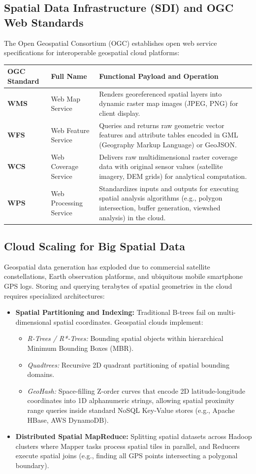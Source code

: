 \documentclass[11pt,a4paper,openany]{report}
\begin{document}
\subsection{Spatial Data Infrastructure (SDI) and OGC Web Standards}
The Open Geospatial Consortium (OGC) establishes open web service specifications for interoperable geospatial cloud platforms:
\begin{center}
\begin{tabularx}{\textwidth}{>{\bfseries}l p{3.5cm} X}
\toprule
OGC Standard & Full Name & Functional Payload and Operation\\
\midrule
WMS & Web Map Service & Renders georeferenced spatial layers into dynamic raster map images (JPEG, PNG) for client display.\\
WFS & Web Feature Service & Queries and returns raw geometric vector features and attribute tables encoded in GML (Geography Markup Language) or GeoJSON.\\
WCS & Web Coverage Service & Delivers raw multidimensional raster coverage data with original sensor values (satellite imagery, DEM grids) for analytical computation.\\
WPS & Web Processing Service & Standardizes inputs and outputs for executing spatial analysis algorithms (e.g., polygon intersection, buffer generation, viewshed analysis) in the cloud.\\
\bottomrule
\end{tabularx}
\end{center}

\subsection{Cloud Scaling for Big Spatial Data}
Geospatial data generation has exploded due to commercial satellite constellations, Earth observation platforms, and ubiquitous mobile smartphone GPS logs. Storing and querying terabytes of spatial geometries in the cloud requires specialized architectures:
\begin{itemize}[leftmargin=*]
  \item \textbf{Spatial Partitioning and Indexing:} Traditional B-trees fail on multi-dimensional spatial coordinates. Geospatial clouds implement:
    \begin{itemize}
      \item \emph{R-Trees / R*-Trees:} Bounding spatial objects within hierarchical Minimum Bounding Boxes (MBR).
      \item \emph{Quadtrees:} Recursive 2D quadrant partitioning of spatial bounding domains.
      \item \emph{GeoHash:} Space-filling Z-order curves that encode 2D latitude-longitude coordinates into 1D alphanumeric strings, allowing spatial proximity range queries inside standard NoSQL Key-Value stores (e.g., Apache HBase, AWS DynamoDB).
    \end{itemize}
  \item \textbf{Distributed Spatial MapReduce:} Splitting spatial datasets across Hadoop clusters where Mapper tasks process spatial tiles in parallel, and Reducers execute spatial joins (e.g., finding all GPS points intersecting a polygonal boundary).
\end{itemize}
\end{document}
